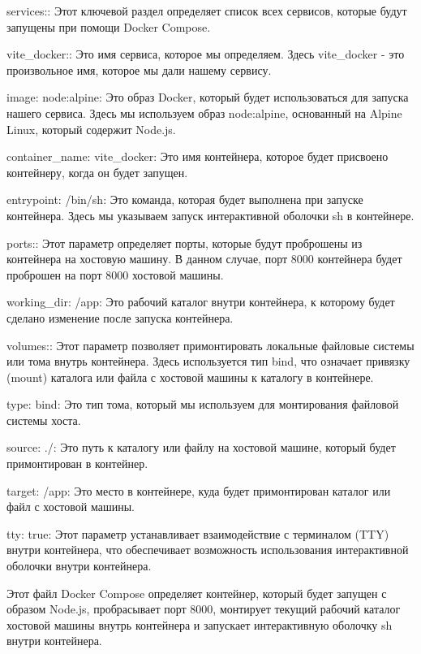 \documentclass[14pt, a4paper]{extarticle}
\begin{document}
services:: Этот ключевой раздел определяет список всех сервисов, которые будут запущены при помощи Docker Compose.

vite\_docker:: Это имя сервиса, которое мы определяем. Здесь vite\_docker - это произвольное имя, которое мы дали нашему сервису.

image: node:alpine: Это образ Docker, который будет использоваться для запуска нашего сервиса. Здесь мы используем образ node:alpine, основанный на Alpine Linux, который содержит Node.js.

container\_name: vite\_docker: Это имя контейнера, которое будет присвоено контейнеру, когда он будет запущен.

entrypoint: /bin/sh: Это команда, которая будет выполнена при запуске контейнера. Здесь мы указываем запуск интерактивной оболочки sh в контейнере.

ports:: Этот параметр определяет порты, которые будут проброшены из контейнера на хостовую машину. В данном случае, порт 8000 контейнера будет проброшен на порт 8000 хостовой машины.

working\_dir: /app: Это рабочий каталог внутри контейнера, к которому будет сделано изменение после запуска контейнера.

volumes:: Этот параметр позволяет примонтировать локальные файловые системы или тома внутрь контейнера. Здесь используется тип bind, что означает привязку (mount) каталога или файла с хостовой машины к каталогу в контейнере.

type: bind: Это тип тома, который мы используем для монтирования файловой системы хоста.

source: ./: Это путь к каталогу или файлу на хостовой машине, который будет примонтирован в контейнер.

target: /app: Это место в контейнере, куда будет примонтирован каталог или файл с хостовой машины.

tty: true: Этот параметр устанавливает взаимодействие с терминалом (TTY) внутри контейнера, что обеспечивает возможность использования интерактивной оболочки внутри контейнера.

Этот файл Docker Compose определяет контейнер, который будет запущен с образом Node.js, пробрасывает порт 8000, монтирует текущий рабочий каталог хостовой машины внутрь контейнера и запускает интерактивную оболочку sh внутри контейнера.
\end{document}
